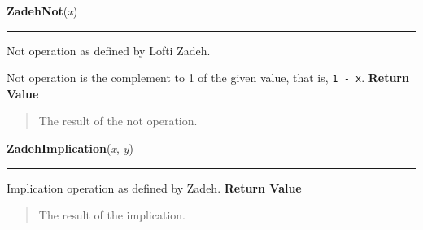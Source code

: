     \label{peach:fuzzy:norms:ZadehNot}

    \vspace{0.5ex}

\hspace{.8\funcindent}\begin{boxedminipage}{\funcwidth}

    \raggedright \textbf{ZadehNot}(\textit{x})

    \vspace{-1.5ex}

    \rule{\textwidth}{0.5\fboxrule}
\setlength{\parskip}{2ex}

Not operation as defined by Lofti Zadeh.

Not operation is the complement to 1 of the given value, that is, \texttt{1 - x}.
\setlength{\parskip}{1ex}
      \textbf{Return Value}
    \vspace{-1ex}

      \begin{quote}

The result of the not operation.
      \end{quote}

    \end{boxedminipage}

    \label{peach:fuzzy:norms:ZadehImplication}

    \vspace{0.5ex}

\hspace{.8\funcindent}\begin{boxedminipage}{\funcwidth}

    \raggedright \textbf{ZadehImplication}(\textit{x}, \textit{y})

    \vspace{-1.5ex}

    \rule{\textwidth}{0.5\fboxrule}
\setlength{\parskip}{2ex}

Implication operation as defined by Zadeh.
\setlength{\parskip}{1ex}
      \textbf{Return Value}
    \vspace{-1ex}

      \begin{quote}

The result of the implication.
      \end{quote}

    \end{boxedminipage}

